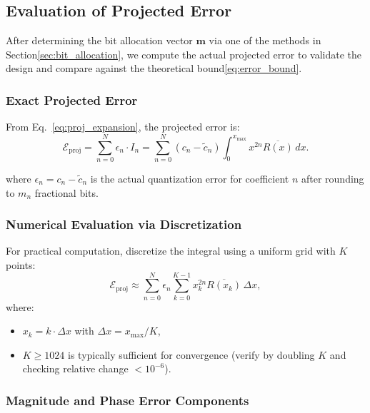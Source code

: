 \subsection{Evaluation of Projected Error}
\label{sec:error_evaluation}

After determining the bit allocation vector $\mathbf{m}$ via one of the methods in Section\ref{sec:bit_allocation}, we compute the actual projected error to validate the design and compare against the theoretical bound\eqref{eq:error_bound}.

\subsubsection{Exact Projected Error}

From Eq.~\eqref{eq:proj_expansion}, the projected error is:
\begin{equation}
\mathcal{E}_{\text{proj}} = \sum_{n=0}^{N} \epsilon_n \cdot I_n = \sum_{n=0}^{N} (c_n - \tilde{c}_n) \int_{0}^{x_{\max}} x^{2n} \overline{R(x)} \, dx.
\label{eq:exact_proj_error}
\end{equation}

where $\epsilon_n = c_n - \tilde{c}_n$ is the actual quantization error for coefficient $n$ after rounding to $m_n$ fractional bits.

\subsubsection{Numerical Evaluation via Discretization}

For practical computation, discretize the integral using a uniform grid with $K$ points:
\begin{equation}
\mathcal{E}_{\text{proj}} \approx \sum_{n=0}^{N} \epsilon_n \sum_{k=0}^{K-1} x_k^{2n} \overline{R(x_k)} \, \Delta x,
\label{eq:discrete_proj_error}
\end{equation}
where:
\begin{itemize}
\item $x_k = k \cdot \Delta x$ with $\Delta x = x_{\max} / K$,
\item $K \geq 1024$ is typically sufficient for convergence (verify by doubling $K$ and checking relative change $< 10^{-6}$).
\end{itemize}

\subsubsection{Magnitude and Phase Error Components}

